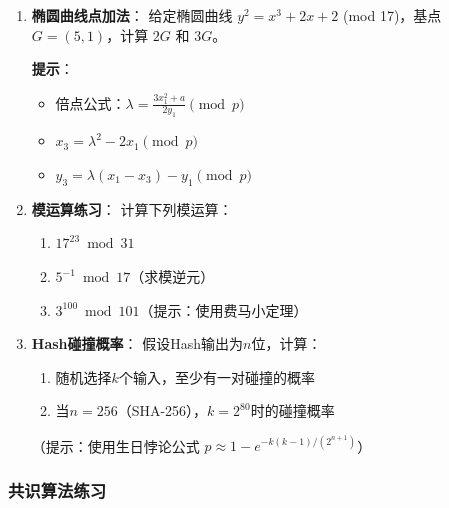 ﻿\documentclass[12pt,a4paper]{article}
\begin{document}
\begin{enumerate}[leftmargin=1.5em]
\item \textbf{椭圆曲线点加法}：
给定椭圆曲线 $y^2 = x^3 + 2x + 2$ (mod 17)，基点 $G = (5, 1)$，计算 $2G$ 和 $3G$。

\textbf{提示}：
\begin{itemize}[leftmargin=1.5em]
\item 倍点公式：$\lambda = \frac{3x_1^2 + a}{2y_1} \pmod p$
\item $x_3 = \lambda^2 - 2x_1 \pmod p$
\item $y_3 = \lambda(x_1 - x_3) - y_1 \pmod p$
\end{itemize}

\item \textbf{模运算练习}：
计算下列模运算：
\begin{enumerate}
\item $17^{23} \bmod 31$
\item $5^{-1} \bmod 17$（求模逆元）
\item $3^{100} \bmod 101$（提示：使用费马小定理）
\end{enumerate}

\item \textbf{Hash碰撞概率}：
假设Hash输出为$n$位，计算：
\begin{enumerate}
\item 随机选择$k$个输入，至少有一对碰撞的概率
\item 当$n = 256$（SHA-256），$k = 2^{80}$时的碰撞概率
\end{enumerate}
（提示：使用生日悖论公式 $p \approx 1 - e^{-k(k-1)/(2^{n+1})}$）
\end{enumerate}

\subsubsection{共识算法练习}
\end{document}
